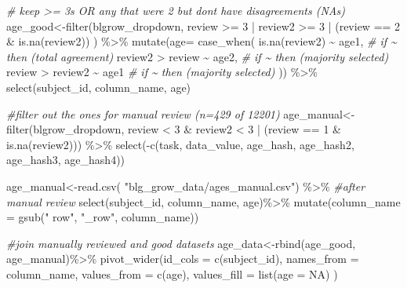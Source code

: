 \documentclass[
]{article}
\newenvironment{Shaded}{\begin{snugshade}}{\end{snugshade}}
\newcommand{\AttributeTok}[1]{\textcolor[rgb]{0.77,0.63,0.00}{#1}}
\newcommand{\CommentTok}[1]{\textcolor[rgb]{0.56,0.35,0.01}{\textit{#1}}}
\newcommand{\ConstantTok}[1]{\textcolor[rgb]{0.00,0.00,0.00}{#1}}
\newcommand{\DecValTok}[1]{\textcolor[rgb]{0.00,0.00,0.81}{#1}}
\newcommand{\FunctionTok}[1]{\textcolor[rgb]{0.00,0.00,0.00}{#1}}
\newcommand{\NormalTok}[1]{#1}
\newcommand{\OtherTok}[1]{\textcolor[rgb]{0.56,0.35,0.01}{#1}}
\newcommand{\SpecialCharTok}[1]{\textcolor[rgb]{0.00,0.00,0.00}{#1}}
\newcommand{\StringTok}[1]{\textcolor[rgb]{0.31,0.60,0.02}{#1}}
\begin{document}
\begin{Shaded}
\begin{Highlighting}[]
\CommentTok{\# keep \textgreater{}= 3s OR any that were 2 but don\textquotesingle{}t have disagreements (NAs) }
\NormalTok{age\_good}\OtherTok{\textless{}{-}}\FunctionTok{filter}\NormalTok{(blgrow\_dropdown, review }\SpecialCharTok{\textgreater{}=} \DecValTok{3} \SpecialCharTok{|}\NormalTok{ review2 }\SpecialCharTok{\textgreater{}=} \DecValTok{3} \SpecialCharTok{|}\NormalTok{ (review }\SpecialCharTok{==} \DecValTok{2} \SpecialCharTok{\&} \FunctionTok{is.na}\NormalTok{(review2)) ) }\SpecialCharTok{\%\textgreater{}\%}
  \FunctionTok{mutate}\NormalTok{(}\AttributeTok{age=} \FunctionTok{case\_when}\NormalTok{(}
    \FunctionTok{is.na}\NormalTok{(review2) }\SpecialCharTok{\textasciitilde{}}\NormalTok{ age1, }\CommentTok{\# if \textasciitilde{} then (total agreement)}
\NormalTok{    review2 }\SpecialCharTok{\textgreater{}}\NormalTok{ review }\SpecialCharTok{\textasciitilde{}}\NormalTok{ age2, }\CommentTok{\# if \textasciitilde{} then (majority selected)}
\NormalTok{    review }\SpecialCharTok{\textgreater{}}\NormalTok{ review2 }\SpecialCharTok{\textasciitilde{}}\NormalTok{ age1 }\CommentTok{\# if \textasciitilde{} then (majority selected)}
\NormalTok{  )) }\SpecialCharTok{\%\textgreater{}\%}
  \FunctionTok{select}\NormalTok{(subject\_id, column\_name, age)}

\CommentTok{\#filter out the ones for manual review (n=429 of 12201)}
\NormalTok{age\_manual}\OtherTok{\textless{}{-}}\FunctionTok{filter}\NormalTok{(blgrow\_dropdown, review }\SpecialCharTok{\textless{}} \DecValTok{3}  \SpecialCharTok{\&}\NormalTok{ review2 }\SpecialCharTok{\textless{}} \DecValTok{3} \SpecialCharTok{|}\NormalTok{ (review }\SpecialCharTok{==} \DecValTok{1} \SpecialCharTok{\&} \FunctionTok{is.na}\NormalTok{(review2))) }\SpecialCharTok{\%\textgreater{}\%}
  \FunctionTok{select}\NormalTok{(}\SpecialCharTok{{-}}\FunctionTok{c}\NormalTok{(task, data\_value, age\_hash, age\_hash2, age\_hash3, age\_hash4))}

\NormalTok{age\_manual}\OtherTok{\textless{}{-}}\FunctionTok{read.csv}\NormalTok{( }\StringTok{"blg\_grow\_data/ages\_manual.csv"}\NormalTok{) }\SpecialCharTok{\%\textgreater{}\%} \CommentTok{\#after manual review }
            \FunctionTok{select}\NormalTok{(subject\_id, column\_name, age)}\SpecialCharTok{\%\textgreater{}\%}
  \FunctionTok{mutate}\NormalTok{(}\AttributeTok{column\_name =} \FunctionTok{gsub}\NormalTok{(}\StringTok{" row"}\NormalTok{, }\StringTok{"\_row"}\NormalTok{, column\_name))}

\CommentTok{\#join manually reviewed and good datasets }
\NormalTok{age\_data}\OtherTok{\textless{}{-}}\FunctionTok{rbind}\NormalTok{(age\_good, age\_manual)}\SpecialCharTok{\%\textgreater{}\%}
  \FunctionTok{pivot\_wider}\NormalTok{(}\AttributeTok{id\_cols =} \FunctionTok{c}\NormalTok{(subject\_id),}
               \AttributeTok{names\_from =}\NormalTok{ column\_name, }
               \AttributeTok{values\_from =} \FunctionTok{c}\NormalTok{(age), }
               \AttributeTok{values\_fill =} \FunctionTok{list}\NormalTok{(}\AttributeTok{age =} \ConstantTok{NA}\NormalTok{) )}
\end{Highlighting}
\end{Shaded}
\end{document}
